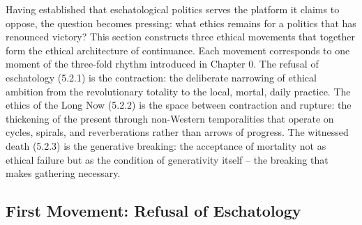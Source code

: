 Having established that eschatological politics serves the platform it claims to oppose, the question becomes pressing: what ethics remains for a politics that has renounced victory? This section constructs three ethical movements that together form the ethical architecture of continuance. Each movement corresponds to one moment of the three-fold rhythm introduced in Chapter 0. The refusal of eschatology (5.2.1) is the contraction: the deliberate narrowing of ethical ambition from the revolutionary totality to the local, mortal, daily practice. The ethics of the Long Now (5.2.2) is the space between contraction and rupture: the thickening of the present through non-Western temporalities that operate on cycles, spirals, and reverberations rather than arrows of progress. The witnessed death (5.2.3) is the generative breaking: the acceptance of mortality not as ethical failure but as the condition of generativity itself – the breaking that makes gathering necessary.

\subsection{First Movement: Refusal of Eschatology}

